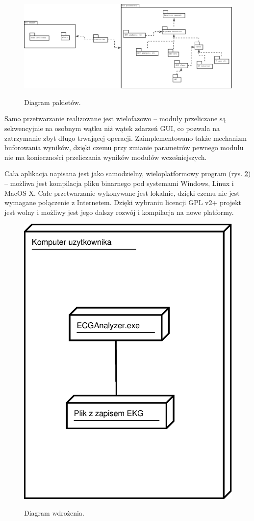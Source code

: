 \documentclass[a4paper, 11pt]{article}
\begin{document}
\begin{figure}[h!]
  \centering
  \includegraphics[width=\linewidth]{include/package_diagram}
  \label{fig:package_diagram}
  \caption{Diagram pakietów.}
\end{figure}

Samo przetwarzanie realizowane jest wielofazowo -- moduły przeliczane są sekwencyjnie na osobnym wątku niż wątek zdarzeń GUI, co pozwala na zatrzymanie zbyt długo trwającej operacji. Zaimplementowano także mechanizm buforowania wyników, dzięki czemu przy zmianie parametrów pewnego modułu nie ma konieczności przeliczania wyników modułów wcześniejszych.

Cała aplikacja napisana jest jako samodzielny, wieloplatformowy program (rys. \ref{fig:deployment_diagram}) -- możliwa jest kompilacja pliku binarnego pod systemami Windows, Linux i MacOS X. Całe przetwarzanie wykonywane jest lokalnie, dzięki czemu nie jest wymagane połączenie z Internetem. Dzięki wybraniu licencji GPL v2+ projekt jest wolny i możliwy jest jego dalszy rozwój i kompilacja na nowe platformy.

\begin{figure}[h!]
  \centering
  \includegraphics[width=0.5\linewidth]{include/deployment_diagram}
  \label{fig:deployment_diagram}
  \caption{Diagram wdrożenia.}
\end{figure}
\end{document}
